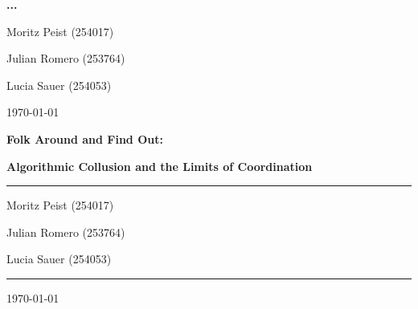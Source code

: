 \documentclass[12pt]{article}
\begin{document}
\begin{titlepage}
    \centering
    \par\vspace{1cm}
    {\huge\bfseries ... \par}
    \vspace{1cm}
    {\Large Moritz Peist (254017)\par}
    {\Large Julian Romero (253764)\par}
    {\Large Lucia Sauer (254053)\par}
    \vfill
    {\large \today\par}
\end{titlepage}


\begin{titlepage}
	\centering
	\par\vspace{1cm}
	{\huge\bfseries Folk Around and Find Out:\par}
    {\large\bfseries Algorithmic Collusion and the Limits of Coordination\par}
	\vspace{1cm}
    \noindent\rule{\textwidth}{1pt}
    {\Large Moritz Peist (254017)\par}
    {\Large Julian Romero (253764)\par}
    {\Large Lucia Sauer (254053)\par}
    \noindent\rule{\textwidth}{1pt}
    \vfill
    \begin{abstract}
        \noindent
        The \emph{Folk Theorem} establishes that collusion can be sustained in repeated interactions, yet empirical evidence suggests coordination becomes more difficult as market participants increase. This thesis presents the first test of whether Large Language Model (LLM) agents exhibit this pattern. In controlled experiments with 2-5 competing agents, we find LLM coordination erodes predictably with competition. Our results show a 3.7\% reduction in equilibrium price for each additional firm (p < 0.001), with prices declining smoothly. This culminates in a 10.6\% total price reduction from duopoly to five-agent markets, providing quantitative evidence on algorithmic collusion boundaries in the AI era.
    \end{abstract}
	\vfill
	{\large \today\par}
\end{titlepage}

\tableofcontents
\thispagestyle{empty}

\newpage
\addtocounter{page}{-1}







\newpage
\printbibliography[heading=bibintoc,title={References}]

\newpage

\end{document}
